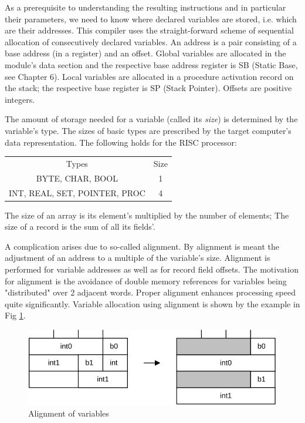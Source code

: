 As a prerequisite to understanding the resulting instructions and in particular their parameters, we
need to know where declared variables are stored, i.e. which are their addresses. This compiler
uses the straight-forward scheme of sequential allocation of consecutively declared variables. An
address is a pair consisting of a base address (in a register) and an offset. Global variables are
allocated in the module's data section and the respective base address register is SB (Static Base,
see Chapter 6). Local variables are allocated in a procedure activation record on the stack; the
respective base register is SP (Stack Pointer). Offsets are positive integers.

The amount of storage needed for a variable (called its \emph{size}) is determined by the variable's
type.  The sizes of basic types are prescribed by the target computer's data representation.
The following holds for the RISC processor:
\begin{table}[h!]
  \centering
  \begin{tabular}{c c}
    Types                         & Size \\
    BYTE, CHAR, BOOL              & 1 \\
    INT, REAL, SET, POINTER, PROC & 4
  \end{tabular}
\end{table}

The size of an array is its element's multiplied by the number of elements; The size of a record is
the sum of all its fields'.

A complication arises due to so-called alignment. By alignment is meant the adjustment of an
address to a multiple of the variable's size. Alignment is performed for variable addresses as well
as for record field offsets. The motivation for alignment is the avoidance of double memory
references for variables being "distributed" over 2 adjacent words. Proper alignment enhances
processing speed quite significantly. Variable allocation using alignment is shown by the example
in Fig \ref{fig:varalign}.
\begin{figure}[h!]
  \centering
  \includegraphics[width=.75\textwidth]{i/C/2.png}
  \caption{Alignment of variables}
  \label{fig:varalign}
\end{figure}

